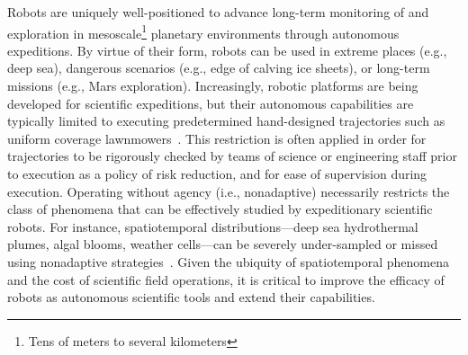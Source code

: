 Robots are uniquely well-positioned to advance long-term monitoring of and exploration in mesoscale\footnote{Tens of meters to several kilometers} planetary environments through autonomous expeditions.
By virtue of their form, robots can be used in extreme places (e.g., deep sea), dangerous scenarios (e.g., edge of calving ice sheets), or long-term missions (e.g., Mars exploration). Increasingly, robotic platforms are being developed for scientific expeditions, but their autonomous capabilities are typically limited to executing predetermined hand-designed trajectories such as uniform coverage lawnmowers~\autocite{camilli2010tracking}.
This restriction is often applied in order for trajectories to be rigorously checked by teams of science or engineering staff prior to execution as a policy of risk reduction, and for ease of supervision during execution.
Operating without agency (i.e., nonadaptive) necessarily restricts the class of phenomena that can be effectively studied by expeditionary scientific robots.
For instance, spatiotemporal distributions---deep sea hydrothermal plumes, algal blooms, weather cells---can be severely under-sampled or missed using nonadaptive strategies~\autocite{flaspohler2019information, preston2019adaptive}.
Given the ubiquity of spatiotemporal phenomena and the cost of scientific field operations, it is critical to improve the efficacy of robots as autonomous scientific tools and extend their capabilities.

